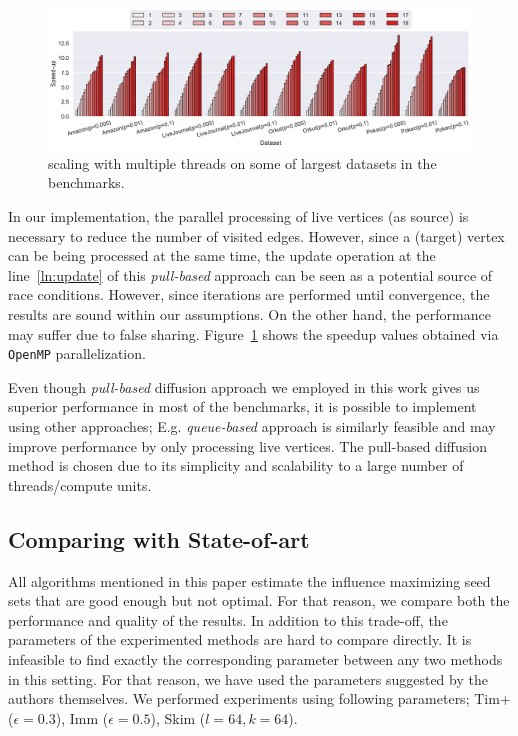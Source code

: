 \documentclass[10pt,journal,compsoc]{IEEEtran}
\newcommand\acro{{\sc{HyperFuseR\xspace}\xspace}\xspace}
\begin{document}
\begin{figure}[!ht] 
    \centering
    \includegraphics[width=\linewidth]{images/threads.pdf}
   \centering \caption{\acro scaling with multiple threads on some of largest datasets in the benchmarks.
     \label{fig:scaling}} 
\end{figure}


In our implementation, the parallel processing of live vertices  (as source) is necessary to reduce the number of visited edges. However, since a (target) vertex can be being processed at the same time, the update operation at the line~\ref {ln:update} of this {\em pull-based} approach can be seen as a potential source of race conditions. However, since iterations are performed until convergence, the results are sound within our assumptions. On the other hand, the performance may suffer due to false sharing.
Figure~\ref{fig:scaling} shows the speedup values obtained via {\tt OpenMP} parallelization.

Even though {\em pull-based} diffusion approach we employed in this work gives us superior performance in most of the benchmarks, it is possible to implement \acro using other approaches; E.g. {\em queue-based} approach is similarly feasible and may improve performance by only processing live vertices. The pull-based diffusion method is chosen due to its simplicity and scalability to a large number of threads/compute units. 

\subsection{Comparing \acro with State-of-art}
All algorithms mentioned in this paper estimate the influence maximizing seed sets that are good enough but not optimal. For that reason, we compare both the performance and quality of the results. In addition to this trade-off, the parameters of the experimented methods are hard to compare directly. It is infeasible to find exactly the corresponding parameter between any two methods in this setting. For that reason, we have used the parameters suggested by the  authors themselves.
We performed experiments using following parameters; {\sc Tim+} ($\epsilon=0.3$), {\sc Imm} ($\epsilon=0.5$), {\sc Skim} ($l=64,k=64$). 
\end{document}
